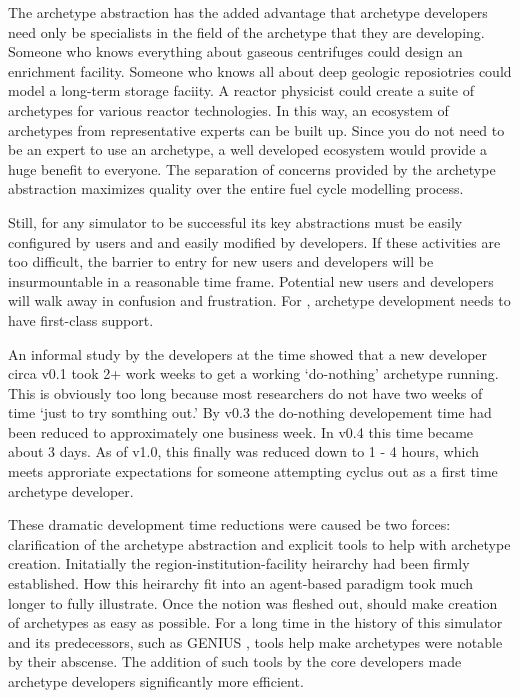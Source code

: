 The archetype abstraction has the added advantage that archetype developers 
need only be specialists in the field of the archetype that they are developing.
Someone who knows everything about gaseous centrifuges could design 
an enrichment facility. Someone who knows all about deep geologic reposiotries
could model a long-term storage faciity. A reactor physicist could create 
a suite of archetypes for various reactor technologies. In this way, an ecosystem 
of archetypes from representative experts can be built up. Since you do not need
to be an expert to use an archetype, a well developed ecosystem would provide 
a huge benefit to everyone. The separation of concerns provided by the archetype 
abstraction maximizes quality over the entire fuel cycle modelling process.

Still, for any simulator to be successful its key abstractions must be easily 
configured by users and and easily modified by developers.  If these activities are 
too difficult, the barrier to entry for new users and developers will be 
insurmountable in a reasonable time frame. Potential new users and developers will 
walk away in confusion and frustration. For \cyclus, archetype development
needs to have first-class support.

An informal study 
by the developers at the time showed that a new developer circa \cyclus v0.1
took 2+ work weeks to get a working `do-nothing' archetype running. This is obviously 
too long because most researchers do not have two weeks of time `just to try 
somthing out.' By \cyclus v0.3 the do-nothing developement time had been reduced 
to approximately one business week. In \cyclus v0.4 this time became about 3 days.
As of \cyclus v1.0, this finally was reduced down to 1 - 4 hours, which meets
approriate expectations for someone attempting cyclus out as a first time archetype 
developer.

These dramatic development time reductions were caused be two forces:
clarification of the archetype abstraction and explicit tools to help with 
archetype creation. Initatially the region-institution-facility heirarchy 
had been firmly established. How this heirarchy fit into an agent-based 
paradigm took much longer to fully illustrate. Once the notion was fleshed out,
\Cyclus should make creation of archetypes as easy as possible. 
For a long time in the history of this simulator and its predecessors, such as 
GENIUS \citeme, tools help make archetypes were notable by their abscense. 
The addition of such tools by the \cyclus core developers made archetype
developers significantly more efficient.

